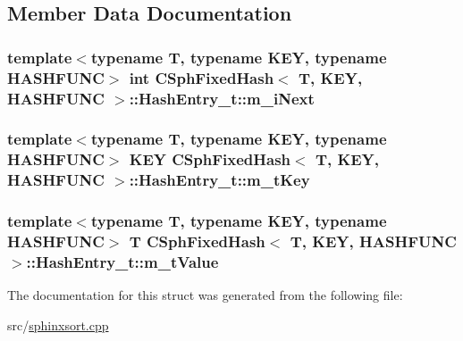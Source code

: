 \subsection{Member Data Documentation}
\hypertarget{structCSphFixedHash_1_1HashEntry__t_aef4b78c55adb55bda3200617ef2cfd96}{
\subsubsection[{m\-\_\-i\-Next}]{\setlength{\rightskip}{0pt plus 5cm}template$<$typename T, typename K\-E\-Y, typename H\-A\-S\-H\-F\-U\-N\-C$>$ {\bf int} {\bf C\-Sph\-Fixed\-Hash}$<$ T, K\-E\-Y, H\-A\-S\-H\-F\-U\-N\-C $>$\-::Hash\-Entry\-\_\-t\-::m\-\_\-i\-Next}}\label{structCSphFixedHash_1_1HashEntry__t_aef4b78c55adb55bda3200617ef2cfd96}
\hypertarget{structCSphFixedHash_1_1HashEntry__t_a29fb153aa93dcdf5f20a5c1d04523359}{
\subsubsection[{m\-\_\-t\-Key}]{\setlength{\rightskip}{0pt plus 5cm}template$<$typename T, typename K\-E\-Y, typename H\-A\-S\-H\-F\-U\-N\-C$>$ K\-E\-Y {\bf C\-Sph\-Fixed\-Hash}$<$ T, K\-E\-Y, H\-A\-S\-H\-F\-U\-N\-C $>$\-::Hash\-Entry\-\_\-t\-::m\-\_\-t\-Key}}\label{structCSphFixedHash_1_1HashEntry__t_a29fb153aa93dcdf5f20a5c1d04523359}
\hypertarget{structCSphFixedHash_1_1HashEntry__t_a2f3dd7f47fea203cd2bae049634c7de3}{
\subsubsection[{m\-\_\-t\-Value}]{\setlength{\rightskip}{0pt plus 5cm}template$<$typename T, typename K\-E\-Y, typename H\-A\-S\-H\-F\-U\-N\-C$>$ T {\bf C\-Sph\-Fixed\-Hash}$<$ T, K\-E\-Y, H\-A\-S\-H\-F\-U\-N\-C $>$\-::Hash\-Entry\-\_\-t\-::m\-\_\-t\-Value}}\label{structCSphFixedHash_1_1HashEntry__t_a2f3dd7f47fea203cd2bae049634c7de3}


The documentation for this struct was generated from the following file\-:\begin{DoxyCompactItemize}
\item 
src/\hyperlink{sphinxsort_8cpp}{sphinxsort.\-cpp}\end{DoxyCompactItemize}
